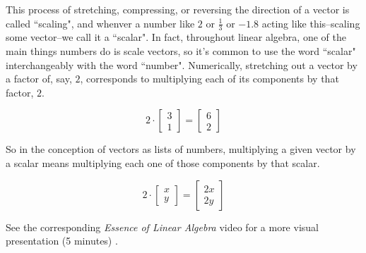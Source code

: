 This process of stretching, compressing, or reversing the direction of a vector
is called ``scaling", and whenver a number like $2$ or $\frac{1}{3}$ or $-1.8$
acting like this--scaling some vector--we call it a ``scalar". In fact,
throughout linear algebra, one of the main things numbers do is scale vectors,
so it's common to use the word ``scalar" interchangeably with the word
``number". Numerically, stretching out a vector by a factor of, say, $2$,
corresponds to multiplying each of its components by that factor, $2$.

\begin{equation*}
  2 \cdot \begin{bmatrix}
    3 \\
    1
  \end{bmatrix} = \begin{bmatrix}
    6 \\
    2
  \end{bmatrix}
\end{equation*}

So in the conception of vectors as lists of numbers, multiplying a given vector
by a scalar means multiplying each one of those components by that scalar.

\begin{equation*}
  2 \cdot \begin{bmatrix}
    x \\
    y
  \end{bmatrix} = \begin{bmatrix}
    2x \\
    2y
  \end{bmatrix}
\end{equation*}

\begin{remark}
  See the corresponding \textit{Essence of Linear Algebra} video for a more
  visual presentation (5 minutes) \cite{bib:linalg_vectors}.
\end{remark}
